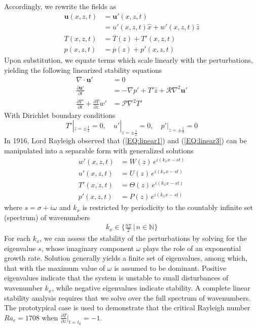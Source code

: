 \documentclass[twocolumn,showpacs,amsmath,amssymb]{revtex4}
\def\hat{\widehat}
\def\bar{\overline}
\begin{document}
Accordingly, we rewrite the fields as
\begin{align}
    \mathbf{u}(x, z, t) &= \mathbf{u'}(x, z, t) \label{EQ:reynolds_dc_u}\\
    &= u'(x, z, t)\hat{x} + w'(x, z, t)\hat{z} \\
    T(x, z, t) &= \bar{T}(z) + T'(x, z, t) \label{EQ:reynolds_dc_T}\\
    p(x, z, t) &= \bar{p}(z) + p'(x, z, t)
\end{align}
Upon substitution, we equate terms which scale linearly with the perturbations, yielding the following linearized stability equations
\begin{align}
    \nabla \cdot \mathbf{u'} &= 0 \label{EQ:linear1}\\
    \frac{\partial\mathbf{u'}}{\partial t} &= - \nabla p' + T'\hat{z} + \mathcal{R} \nabla^2 \mathbf{u'} \label{EQ:linear2}\\
    \frac{\partial T'}{\partial t} + \frac{\partial \bar{T}}{\partial z} w' &= \mathcal{P} \nabla^2 T'\label{EQ:linear3}
\end{align}
With Dirichlet boundary conditions 
\begin{equation}
    T'|_{z = \pm \frac{1}{2}} = 0, \quad u'|_{z = \pm \frac{1}{2}} = 0, \quad p'|_{z = \pm \frac{1}{2}} = 0
\end{equation}
In 1916, Lord Rayleigh observed that (\ref{EQ:linear1}) and (\ref{EQ:linear3}) can be manipulated into a separable form with generalized solutions
\begin{align}
    w'(x, z, t) &= W(z) \, e^{i(k_xx-st)} \label{EQ:normal_modes1}\\ 
    u'(x, z, t) &= U(z) \, e^{i(k_xx-st)} \label{EQ:normal_modes2}\\ 
    T'(x, z, t) &= \Theta(z) \, e^{i(k_xx-st)} \label{EQ:normal_modes3}\\ 
    p'(x, z, t) &= P(z) \, e^{i(k_xx-st)}\label{EQ:normal_modes4}
\end{align}
where $s = \sigma + i\omega$ and $k_x$ is restricted by periodicity to the countably infinite set (spectrum) of wavenumbers
\begin{align}
    k_x \in \big\{\frac{n\pi}{2} \, \big| \, n \in \mathbb{N}\big\}
\end{align}
For each $k_x$, we can assess the stability of the perturbations by solving for the eigenvalue $s$, whose imaginary component $\omega$ plays the role of an exponential growth rate. Solution generally yields a finite set of eigenvalues, among which, that with the maximum value of $\omega$ is assumed to be dominant. Positive eigenvalues indicate that the system is unstable to small disturbances of wavenumber $k_x$, while negative eigenvalues indicate stability. A complete linear stability analysis requires that we solve over the full spectrum of wavenumbers. The prototypical case is used to demonstrate that the critical Rayleigh number $Ra_c = 1708$ when $\frac{\partial \bar{T}}{\partial z}\big|_{t=t_0} = -1$.
\end{document}

